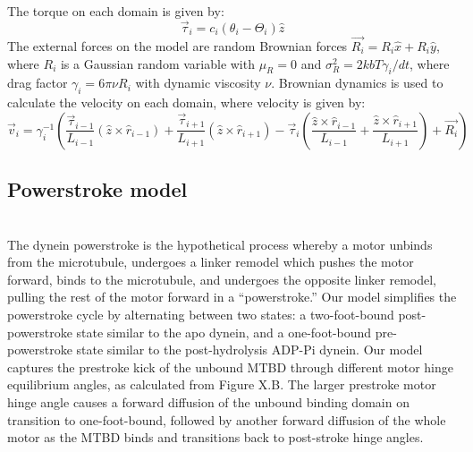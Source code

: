 \documentclass[9pt,twocolumn,twoside]{pnas-new}
\begin{document}
The torque on each domain is given by:
%
\begin{equation}
  \vec{\tau}_{i} = c_i\left(\theta_{i}-\Theta_{i}\right)\hat{z}
\end{equation}
%
The external forces on the model are random Brownian forces $\vec{R_i} = R_i\hat{x} + R_i\hat{y}$, where $R_i$ is a Gaussian random variable with $\mu_R = 0$ and $\sigma^2_R = 2kbT\gamma_i/dt$, where drag factor $\gamma_i = 6\pi\nu R_i$ with dynamic viscosity $\nu$. Brownian dynamics is used to calculate the velocity on each domain, where velocity is given by:
%
\begin{dmath}
  \vec{v}_i = \gamma_i^{-1}\left(\frac{\vec{\tau}_{i-1}}{L_{i-1}}\left(\hat{z}\times\hat{r}_{i-1}\right)
  + \frac{\vec{\tau}_{i+1}}{L_{i+1}}\left(\hat{z}\times\hat{r}_{i+1}\right)
  - \vec{\tau}_{i}\left(\frac{\hat{z}\times\hat{r}_{i-1}}{L_{i-1}}+\frac{\hat{z}\times\hat{r}_{i+1}}{L_{i+1}}\right) + \vec{R_i}\right)
  \label{eq:motionequation}
\end{dmath}
%
\subsection*{Powerstroke model}~\\
The dynein powerstroke is the hypothetical process whereby a motor unbinds from the microtubule, undergoes a linker remodel which pushes the motor forward, binds to the microtubule, and undergoes the opposite linker remodel, pulling the rest of the motor forward in a ``powerstroke.'' Our model simplifies the powerstroke cycle by alternating between two states: a two-foot-bound post-powerstroke state similar to the apo dynein, and a one-foot-bound pre-powerstroke state similar to the post-hydrolysis ADP-Pi dynein. Our model captures the prestroke kick of the unbound MTBD through different motor hinge equilibrium angles, as calculated from Figure X.B. The larger prestroke motor hinge angle causes a forward diffusion of the unbound binding domain on transition to one-foot-bound, followed by another forward diffusion of the whole motor as the MTBD binds and transitions back to post-stroke hinge angles.\\
\end{document}
